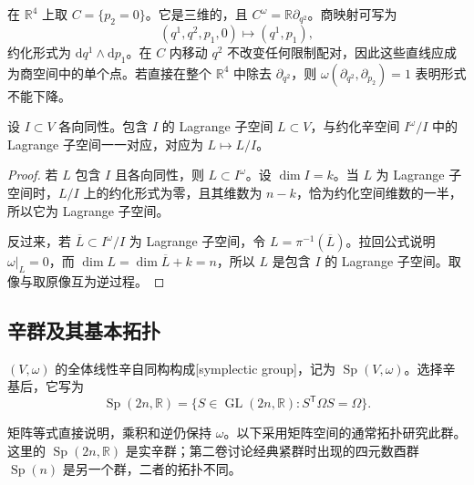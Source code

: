 \begin{example}\label{g4:exm:0701:one-constraint}
	在 \(\mathbb R^4\) 上取 \(C=\{p_2=0\}\)。它是三维的，且 \(C^\omega=\mathbb R\partial_{q^2}\)。商映射可写为
	\[
		(q^1,q^2,p_1,0)\longmapsto(q^1,p_1),
	\]
	约化形式为 \(\mathrm{d}q^1\wedge\mathrm{d}p_1\)。在 \(C\) 内移动 \(q^2\) 不改变任何限制配对，因此这些直线应成为商空间中的单个点。若直接在整个 \(\mathbb R^4\) 中除去 \(\partial_{q^2}\)，则 \(\omega(\partial_{q^2},\partial_{p_2})=1\) 表明形式不能下降。
\end{example}



\begin{proposition}\label{g4:prop:0701:lagrangian-reduction}
	设 \(I\subset V\) 各向同性。包含 \(I\) 的 Lagrange 子空间 \(L\subset V\)，与约化辛空间 \(I^\omega/I\) 中的 Lagrange 子空间一一对应，对应为 \(L\mapsto L/I\)。
\end{proposition}
\begin{proof}
	若 \(L\) 包含 \(I\) 且各向同性，则 \(L\subset I^\omega\)。设 \(\dim I=k\)。当 \(L\) 为 Lagrange 子空间时，\(L/I\) 上的约化形式为零，且其维数为 \(n-k\)，恰为约化空间维数的一半，所以它为 Lagrange 子空间。

	反过来，若 \(\overline L\subset I^\omega/I\) 为 Lagrange 子空间，令 \(L=\pi^{-1}(\overline L)\)。拉回公式说明 \(\omega|_L=0\)，而 \(\dim L=\dim\overline L+k=n\)，所以 \(L\) 是包含 \(I\) 的 Lagrange 子空间。取像与取原像互为逆过程。
\end{proof}

\subsection{辛群及其基本拓扑}
\label{g4:subsec:0701:04}

\begin{definition}\label{g4:def:0701:symplectic-group}
	\((V,\omega)\) 的全体线性辛自同构构成[symplectic group]，记为 \(\operatorname{Sp}(V,\omega)\)。选择辛基后，它写为
	\[
		\operatorname{Sp}(2n,\mathbb R)
		=\{S\in\operatorname{GL}(2n,\mathbb R):S^{\mathsf T}\Omega S=\Omega\}.
	\]
\end{definition}

矩阵等式直接说明，乘积和逆仍保持 \(\omega\)。以下采用矩阵空间的通常拓扑研究此群。这里的 \(\operatorname{Sp}(2n,\mathbb R)\) 是实辛群；第二卷讨论经典紧群时出现的四元数酉群 \(\operatorname{Sp}(n)\) 是另一个群，二者的拓扑不同。

